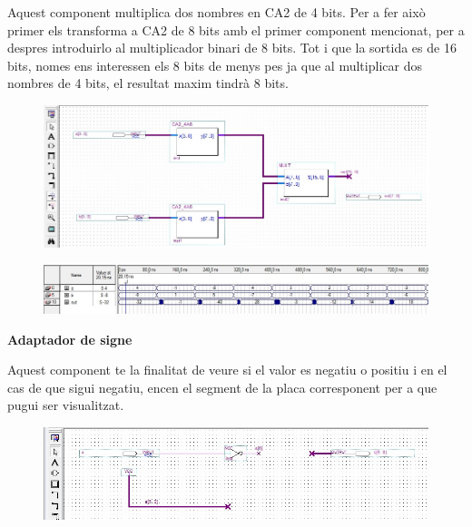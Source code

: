 \documentclass[12pt, a4papre]{article}
\begin{document}
	Aquest component multiplica dos nombres en CA2 de 4 bits. Per a fer això primer els transforma a CA2 de 8 bits amb el primer component mencionat, per a despres introduirlo al multiplicador binari de 8 bits. Tot i que la sortida es de 16 bits, nomes ens interessen els 8 bits de menys pes ja que al multiplicar dos nombres de 4 bits, el resultat maxim tindrà 8 bits.
	
	
	\begin{center}
	\begin{figure}[H]
		\begin{center}
		\includegraphics[width=150mm]{multCA2_4B.jpeg}
		\end{center}
	\end{figure}
	
	\end{center}
	\begin{center}
	\begin{figure}[H]
		\begin{center}
		\includegraphics[width=150mm]{multCA2_4Bsimul.jpeg}
		\end{center}
	\end{figure}
	
	\end{center}
	
	
	\textbf{\large{Adaptador de signe}}
	
	Aquest component te la finalitat de veure si el valor es negatiu o positiu i en el cas de que sigui negatiu, encen el segment de la placa corresponent per a que pugui ser visualitzat.
	
	\begin{center}
	\begin{figure}[H]
		\begin{center}
		\includegraphics[width=150mm]{adaptSigne.jpeg}
		\end{center}
	\end{figure}
	
	\end{center}
	
\end{document}
